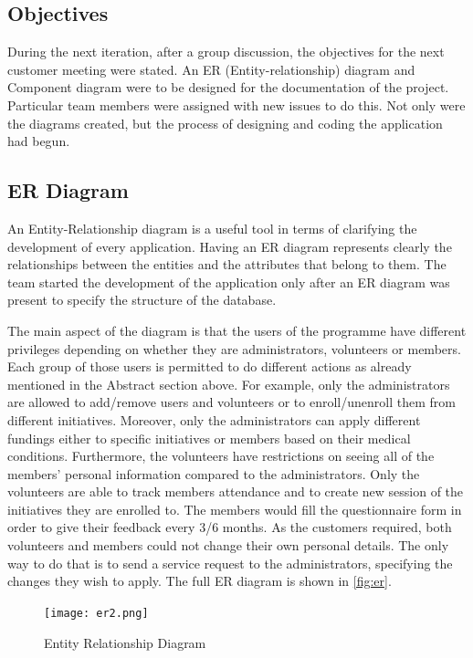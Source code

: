 \documentclass{l3proj}
\begin{document}
\subsection{Objectives}
\label{sec:objectives}

During the next iteration, after a group discussion, the objectives for the next customer meeting were stated. An ER (Entity-relationship) diagram and Component diagram were to be designed for the documentation of the project. Particular team members were assigned with new issues to do this. Not only were the diagrams created, but the process of designing and coding the application had begun. 

\subsection{ER Diagram}
\label{sec:er}

An Entity-Relationship diagram \cite{er} is a useful tool in terms of clarifying the development of every application. Having an ER diagram represents clearly the relationships between the entities and the attributes that belong to them. The team started the development of the application only after an ER diagram was present to specify the structure of the database.

The main aspect of the diagram is that the users of the programme have different privileges depending on whether they are administrators, volunteers or members. Each group of those users is permitted to do different actions as already mentioned in the Abstract section above. For example, only the administrators are allowed to add/remove users and volunteers or to enroll/unenroll them from different initiatives. Moreover, only the administrators can apply different fundings either to specific initiatives or members based on their medical conditions. Furthermore, the volunteers have restrictions on seeing all of the members' personal information compared to the administrators. Only the volunteers are able to track members attendance and to create new session of  the initiatives they are enrolled to. The members would fill the questionnaire form in order to give their feedback every 3/6 months. As the customers required, both volunteers and members could not change their own personal details. The only way to do that is to send a service request to the administrators, specifying the changes they wish to apply. The full ER diagram is shown in \autoref{fig:er}.


\begin{figure}
\centerline{\texttt{[image: er2.png]}}
\caption{Entity Relationship Diagram}
\label{fig:er}
\end{figure}
\end{document}
